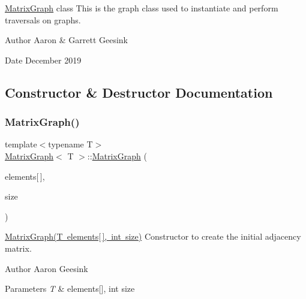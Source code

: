 \mbox{\hyperlink{class_matrix_graph}{Matrix\+Graph}} class This is the graph class used to instantiate and perform traversals on graphs. 

\begin{DoxyAuthor}{Author}
Aaron \& Garrett Geesink 
\end{DoxyAuthor}
\begin{DoxyDate}{Date}
December 2019 
\end{DoxyDate}


\subsection{Constructor \& Destructor Documentation}
\mbox{\label{class_matrix_graph_a388cdebfe849fd7f1b5bb48638b097d0}} 
\subsubsection{\texorpdfstring{MatrixGraph()}{MatrixGraph()}}
{\footnotesize\ttfamily template$<$typename T$>$ \\
\mbox{\hyperlink{class_matrix_graph}{Matrix\+Graph}}$<$ T $>$\+::\mbox{\hyperlink{class_matrix_graph}{Matrix\+Graph}} (\begin{DoxyParamCaption}\item[{T}]{elements\mbox{[}$\,$\mbox{]},  }\item[{int}]{size }\end{DoxyParamCaption})}



\mbox{\hyperlink{class_matrix_graph_a388cdebfe849fd7f1b5bb48638b097d0}{Matrix\+Graph(\+T elements\mbox{[}$\,$\mbox{]}, int size)}} Constructor to create the initial adjacency matrix. 

\begin{DoxyAuthor}{Author}
Aaron Geesink 
\end{DoxyAuthor}

\begin{DoxyParams}{Parameters}
{\em T} & elements\mbox{[}\mbox{]}, int size \\
\hline
\end{DoxyParams}
\mbox{\label{class_matrix_graph_ab84318948ee00c6d4ee05bf3506e17b2}} 

